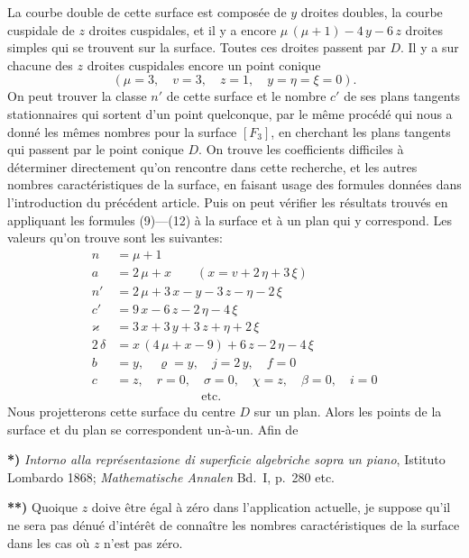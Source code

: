 \documentclass{article}
\begin{document}
La courbe double de cette surface est composée de $y$ droites doubles, la courbe cuspidale de $z$ droites cuspidales, et il y a encore $\mu\,(\mu + 1) - 4\,y - 6\,z$ droites simples qui se trouvent sur la surface. Toutes ces droites passent par $D$. Il y a sur chacune des $z$ droites cuspidales encore un point conique
\[
(\mu = 3, \quad v = 3, \quad z = 1, \quad y = \eta = \xi = 0).
\]
On peut trouver la classe $n'$ de cette surface et le nombre $c'$ de ses plans tangents stationnaires qui sortent d'un point quelconque, par le même procédé qui nous a donné les mêmes nombres pour la surface $[F_3]$, en cherchant les plans tangents qui passent par le point conique $D$. On trouve les coefficients difficiles à déterminer directement qu'on rencontre dans cette recherche, et les autres nombres caractéristiques de la surface, en faisant usage des formules données dans l'introduction du précédent article. Puis on peut vérifier les résultats trouvés en appliquant les formules (9)---(12) à la surface et à un plan qui y correspond. Les valeurs qu'on trouve sont les suivantes:
\[
\begin{aligned}
n &= \mu + 1 \\
a &= 2\,\mu + x \qquad (x = v + 2\,\eta + 3\,\xi) \\
n' &= 2\,\mu + 3\,x - y - 3\,z - \eta - 2\,\xi \\
c' &= 9\,x - 6\,z - 2\,\eta - 4\,\xi \\
\varkappa &= 3\,x + 3\,y + 3\,z + \eta + 2\,\xi \\
2\,\delta &= x\,(4\,\mu + x - 9) + 6\,z - 2\,\eta - 4\,\xi \\
b &= y, \quad \varrho = y, \quad j = 2\,y, \quad f = 0 \\
c &= z, \quad r = 0, \quad \sigma = 0, \quad \chi = z, \quad \beta = 0, \quad i = 0 \\
&\phantom{{}=} \qquad\qquad\qquad \text{etc.}
\end{aligned}
\]
Nous projetterons cette surface du centre $D$ sur un plan. Alors les points de la surface et du plan se correspondent un-à-un. Afin de

\textbf{*)} \emph{Intorno alla représentazione di superficie algebriche sopra un piano}, Istituto Lombardo 1868; \emph{Mathematische Annalen} Bd.~I, p.~280 etc.

\textbf{**)} Quoique $z$ doive être égal à zéro dans l'application actuelle, je suppose qu'il ne sera pas dénué d'intérêt de connaître les nombres caractéristiques de la surface dans les cas où $z$ n'est pas zéro.
\end{document}
